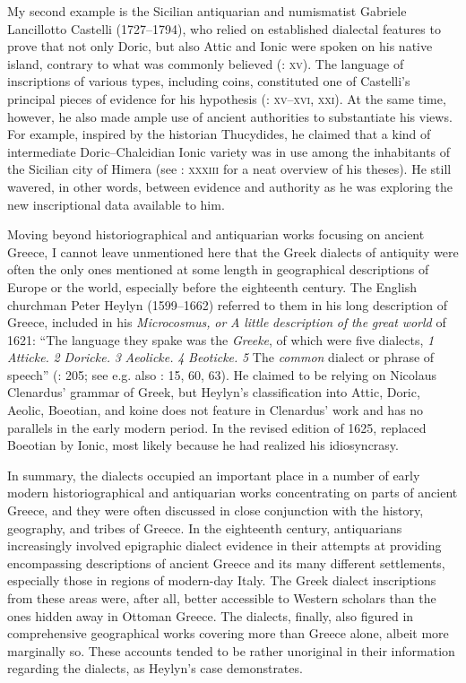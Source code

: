 \documentclass[output=paper]{langsci/langscibook}
\begin{document}
My second example is the Sicilian antiquarian and numismatist Gabriele Lancillotto Castelli (1727–1794), who relied on established dialectal features to prove that not only Doric, but also Attic and Ionic were spoken on his native island, contrary to what was commonly believed (\citealt{Castelli1769}: \textsc{xv}). The language of inscriptions of various types, including coins, constituted one of Castelli’s principal pieces of evidence for his hypothesis (\citealt{Castelli1769}: \textsc{xv–xvi,} \textsc{xxi}). At the same time, however, he also made ample use of ancient authorities to substantiate his views. For example, inspired by the historian Thucydides, he claimed that a kind of intermediate Doric–Chalcidian Ionic variety was in use among the inhabitants of the Sicilian city of Himera (see \citealt{Castelli1769}: \textsc{xxxiii} for a neat overview of his theses). He still wavered, in other words, between evidence and authority as he was exploring the new inscriptional data available to him.

Moving beyond historiographical and antiquarian works focusing on ancient Greece, I cannot leave unmentioned here that the Greek dialects of antiquity were often the only ones mentioned at some length in geographical descriptions of Europe or the world, especially before the eighteenth century. The English churchman Peter Heylyn (1599–1662) referred to them in his long description of Greece, included in his \textit{Microcosmus,} \textit{or} \textit{A} \textit{little} \textit{description} \textit{of} \textit{the} \textit{great} \textit{world} of 1621: “The language they spake was the \textit{Greeke}, of which were five dialects, \textit{1} \textit{Atticke.} \textit{2} \textit{Doricke.} \textit{3} \textit{Aeolicke.} \textit{4} \textit{Beoticke.} \textit{5} The \textit{common} dialect or phrase of speech” (\citealt{Heylyn1621}: 205; see e.g. also \citealt{Speed1676}: 15, 60, 63). He claimed to be relying on Nicolaus Clenardus’ grammar of Greek, but Heylyn’s classification into Attic, Doric, Aeolic, Boeotian, and koine does not feature in Clenardus’ work and has no parallels in the early modern period. In the revised edition of 1625, \citet[375]{Heylyn1625} replaced Boeotian by Ionic, most likely because he had realized his idiosyncrasy.

In summary, the dialects occupied an important place in a number of early modern historiographical and antiquarian works concentrating on parts of ancient Greece, and they were often discussed in close conjunction with the history, geography, and tribes of Greece. In the eighteenth century, antiquarians increasingly involved epigraphic dialect evidence in their attempts at providing encompassing descriptions of ancient Greece and its many different settlements, especially those in regions of modern-day Italy. The Greek dialect inscriptions from these areas were, after all, better accessible to Western scholars than the ones hidden away in Ottoman Greece. The dialects, finally, also figured in comprehensive geographical works covering more than Greece alone, albeit more marginally so. These accounts tended to be rather unoriginal in their information regarding the dialects, as Heylyn’s case demonstrates.
\end{document}
